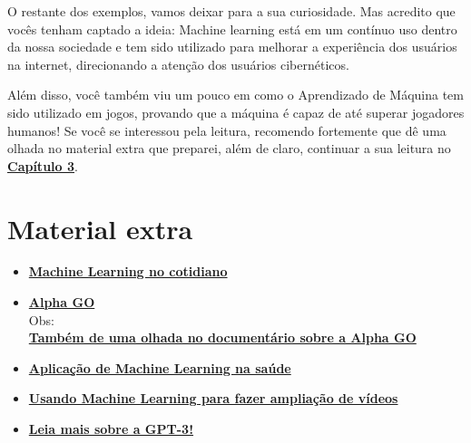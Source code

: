 \documentclass[12pt]{article}
\begin{document}
    O restante dos exemplos, vamos deixar para a sua curiosidade. Mas acredito que 
    vocês tenham captado a ideia: Machine learning está em um contínuo uso dentro da 
    nossa sociedade e tem sido utilizado para melhorar a experiência dos usuários na internet, 
    direcionando a atenção dos usuários cibernéticos.

    Além disso, você também viu um pouco em como o Aprendizado de Máquina
    tem sido utilizado em jogos, provando que a máquina é capaz de até superar jogadores
    humanos! Se você se interessou pela leitura, recomendo fortemente que dê
    uma olhada no material extra que preparei, além de claro, continuar a sua leitura
    no \href{../Capitulo_03/Capitulo03.pdf}{\textbf{Capítulo 3}}.


    \newpage
    \section*{\centering Material extra}\label{sec:extra} %

    \begin{itemize}
        \item \href{http://datascienceacademy.com.br/blog/17-casos-de-uso-de-machine-learning/}{\textbf{Machine Learning no cotidiano}}
        \item \href{https://deepmind.com/research/case-studies/alphago-the-story-so-far}{\textbf{Alpha GO}} \\ Obs: \\ \href{https://youtu.be/WXuK6gekU1Y}{\textbf{Também de uma olhada no documentário sobre a Alpha GO}}
        \item \href{https://youtu.be/uGYJuOyIvzs}{\textbf{Aplicação de Machine Learning na saúde}}
        \item \href{https://youtu.be/AwmvwTopbas}{\textbf{Usando Machine Learning para fazer ampliação de vídeos}}
        \item \href{https://forbes.com.br/forbes-insider/2020/07/por-que-o-programa-de-inteligencia-artificial-gpt-3-e-incrivel-mas-superestimado/}{\textbf{Leia mais sobre a GPT-3!}}
    \end{itemize}

    \newpage
\end{document}
